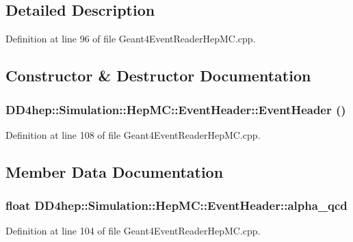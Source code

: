 \subsection{Detailed Description}


Definition at line 96 of file Geant4EventReaderHepMC.cpp.

\subsection{Constructor \& Destructor Documentation}
\hypertarget{class_d_d4hep_1_1_simulation_1_1_hep_m_c_1_1_event_header_a7e32471a0f8b744e116a1ae9d0d7e620}{
\subsubsection[{EventHeader}]{\setlength{\rightskip}{0pt plus 5cm}DD4hep::Simulation::HepMC::EventHeader::EventHeader ()}}
\label{class_d_d4hep_1_1_simulation_1_1_hep_m_c_1_1_event_header_a7e32471a0f8b744e116a1ae9d0d7e620}


Definition at line 108 of file Geant4EventReaderHepMC.cpp.

\subsection{Member Data Documentation}
\hypertarget{class_d_d4hep_1_1_simulation_1_1_hep_m_c_1_1_event_header_aa21d0c781608de75c13594b41011c043}{
\subsubsection[{alpha\_\-qcd}]{\setlength{\rightskip}{0pt plus 5cm}float {\bf DD4hep::Simulation::HepMC::EventHeader::alpha\_\-qcd}}}
\label{class_d_d4hep_1_1_simulation_1_1_hep_m_c_1_1_event_header_aa21d0c781608de75c13594b41011c043}


Definition at line 104 of file Geant4EventReaderHepMC.cpp.

